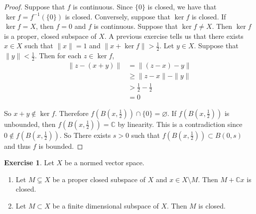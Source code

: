 \documentclass[12pt]{amsart}
\theoremstyle{definition}
\theoremstyle{remark}
\theoremstyle{definition}
\newtheorem{ex}[definition]{Exercise}
\newcommand{\C}{\mathbb{C}}
\begin{document}
	\begin{proof}
		Suppose that $f$ is continuous. Since $\{0\}$ is closed, we have that $\ker f = f^{-1}(\{0\})$ is closed. Conversely, suppose that $\ker f$ is closed. If $\ker f = X$, then $f =0$ and $f$ is continuous. Suppose that $\ker f \neq X$. Then $\ker f$ is a proper, closed subspace of $X$. A previous exercise tells us that there exists $x \in X$ such that $\|x \|= 1$ and $\|x + \ker f \|> \frac{1}{2}$. Let $y \in X$. Suppose that $\|y \|< \frac{1}{2}$. Then for each $z \in \ker f$, 
		\begin{align*}
			\|z -  (x+y)\|
			& = \|(z-x) -y \|\\
			& \geq \|z-x \|- \|y \|\\
			& > \frac{1}{2} - \frac{1}{2} \\
			&=0
		\end{align*}
		
		So $x+y \not \in \ker f$. Therefore $f(B(x,\frac{1}{2})) \cap \{0\} = \varnothing$. If $f(B(x,\frac{1}{2})) $ is unbounded, then $f(B(x,\frac{1}{2})) = \C$ by linearity. This is a contradiction since $0 \not \in f(B(x,\frac{1}{2}))$. So There exists $s > 0$ such that $f(B(x,\frac{1}{2})) \subset B(0,s)$ and thus $f$ is bounded. 
	\end{proof}
	
	\begin{ex}
		Let $X$ be a normed vector space. 
		\begin{enumerate}
			\item Let $M \subsetneq X$ be a proper closed subspace of $X$ and $x \in X \setminus M$. Then $M + \C x$ is closed.
			\item Let $M \subset X$ be a finite dimensional subspace of $X$. Then $M$ is closed.
		\end{enumerate}
	\end{ex}
	
\end{document}
